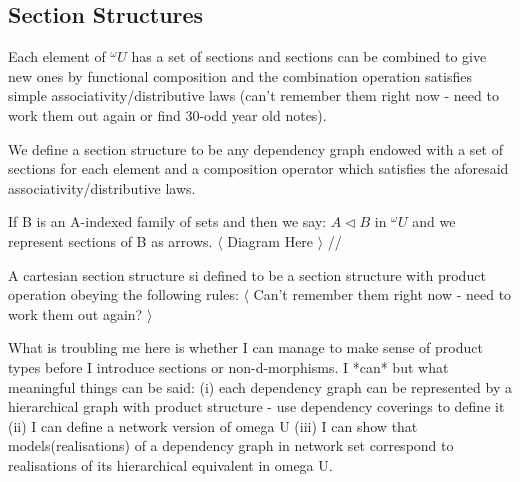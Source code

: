 \subsection{Section Structures}
Each element of $^\omega U$ has a set of sections and sections can be combined to give new ones by functional composition and the combination operation satisfies simple associativity/distributive laws (can't remember them right now - need to work them out again or find 30-odd year old notes).

We define a section structure to be any dependency graph endowed with a set of sections for each element and a composition operator which satisfies the aforesaid associativity/distributive laws.

If B is an A-indexed family of sets and then we say: $A \triangleleft B$ in $^\omega U$ and we represent sections of B as arrows.
$\langle$ Diagram Here $\rangle$
//

\noindent A cartesian section structure si defined to be a section structure with product operation obeying the following rules:
$\langle$ Can't remember them right now - need to work them out again? $\rangle$

\noindent What is troubling me here is whether I can manage to make sense of product types before I introduce sections or non-d-morphisms. I *can* but what meaningful things can be said: (i) each dependency graph can be represented by a hierarchical graph with product structure - use dependency coverings to define it (ii) I can define a network version of 
omega U (iii) I can show that models(realisations) of a dependency graph in network set correspond to realisations of its hierarchical equivalent in omega U.
  
  